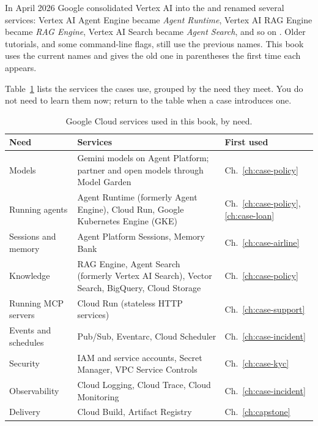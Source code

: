 \begin{versionnote}
In April 2026 Google consolidated Vertex AI into the  and renamed several services: Vertex AI Agent Engine became \emph{Agent Runtime}, Vertex AI RAG Engine became \emph{RAG Engine}, Vertex AI Search became \emph{Agent Search}, and so on \citep{gcpnames2026}. Older tutorials, and some command-line flags, still use the previous names. This book uses the current names and gives the old one in parentheses the first time each appears.
\end{versionnote}

Table~\ref{tab:gcp} lists the services the cases use, grouped by the need they meet. You do not need to learn them now; return to the table when a case introduces one.

\begin{table}[htbp]
\centering
\small
\caption{Google Cloud services used in this book, by need.}
\label{tab:gcp}
\begin{tabularx}{\textwidth}{@{}>{\raggedright\arraybackslash}p{2.6cm}>{\raggedright\arraybackslash}X>{\raggedright\arraybackslash}p{2.2cm}@{}}
\toprule
Need & Services & First used \\
\midrule
Models & Gemini models on Agent Platform; partner and open models through Model Garden & Ch.~\ref{ch:case-policy} \\
Running agents & Agent Runtime (formerly Agent Engine), Cloud Run, Google Kubernetes Engine (GKE) & Ch.~\ref{ch:case-policy}, \ref{ch:case-loan} \\
Sessions and memory & Agent Platform Sessions, Memory Bank & Ch.~\ref{ch:case-airline} \\
Knowledge & RAG Engine, Agent Search (formerly Vertex AI Search), Vector Search, BigQuery, Cloud Storage & Ch.~\ref{ch:case-policy} \\
Running MCP servers & Cloud Run (stateless HTTP services) & Ch.~\ref{ch:case-support} \\
Events and schedules & Pub/Sub, Eventarc, Cloud Scheduler & Ch.~\ref{ch:case-incident} \\
Security & IAM and service accounts, Secret Manager, VPC Service Controls & Ch.~\ref{ch:case-kyc} \\
Observability & Cloud Logging, Cloud Trace, Cloud Monitoring & Ch.~\ref{ch:case-incident} \\
Delivery & Cloud Build, Artifact Registry & Ch.~\ref{ch:capstone} \\
\bottomrule
\end{tabularx}
\end{table}

